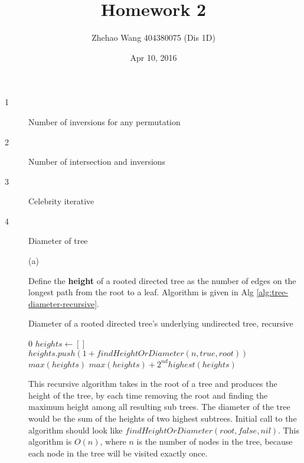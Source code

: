 \documentclass{article}
\title{Homework 2}
\author{Zhehao Wang 404380075 (Dis 1D)}
\date{Apr 10, 2016}
\begin{document}
\maketitle

\begin{description}

\item[1]{Number of inversions for any permutation}

  

\item[2]{Number of intersection and inversions}

  

\item[3]{Celebrity iterative}

  

\item[4]{Diameter of tree}
  
  (a)

  Define the \textbf{height} of a rooted directed tree as the number of edges on the longest path from the root to a leaf. Algorithm is given in Alg \ref{alg:tree-diameter-recursive}.

  \begin{algorithm}[h]
  \caption{Diameter of a rooted directed tree's underlying undirected tree, recursive}
  \label{alg:tree-diameter-recursive}
    \begin{algorithmic}[1]
        \State \Return $0$
      \EndIf
      \State $heights \gets []$
        \State $heights.push(1 + findHeightOrDiameter(n, true, root))$
      \EndFor
        \State \Return $max(heights)$
      \Else
        \State \Return $max(heights) + 2^{nd}highest(heights)$
      \EndIf
    \EndFunction
    \end{algorithmic}
  \end{algorithm}

  This recursive algorithm takes in the root of a tree and produces the height of the tree, by each time removing the root and finding the maximum height among all resulting sub trees. The diameter of the tree would be the sum of the heights of two highest subtrees. Initial call to the algorithm should look like $findHeightOrDiameter(root, false, nil)$. This algorithm is $O(n)$, where $n$ is the number of nodes in the tree, because each node in the tree will be visited exactly once.


\end{description}
\end{document}
